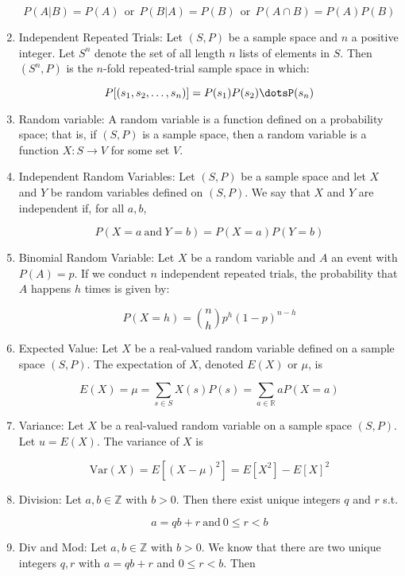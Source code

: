 \documentclass{article}
\begin{document}
\begin{enumerate}
		\[P(A|B)=P(A)\:\: \text{or} \:\: P(B|A)=P(B) \:\: \text{or} \:\: P(A\cap B)=P(A)P(B)\]
		
		\item Independent Repeated Trials: Let $(S,P)$ be a sample space and $n$ a positive integer.
		Let $S^n$ denote the set of all length $n$ lists of elements in $S$.
		Then $(S^n,P)$ is the $n$-fold repeated-trial sample space in which:
		
		\[P[(s_1,s_2,\dots,s_n)]=P(s_1)P(s_2)\dotsP(s_n)\]
		
		\item Random variable: A random variable is a function defined on a probability space;
		that is, if $(S,P)$ is a sample space, then a random variable is a function $X:S\to V$ for some set $V$.
		
		\item Independent Random Variables: Let $(S,P)$ be a sample space and let $X$ and $Y$ be random variables defined on $(S,P)$.
		We say that $X$ and $Y$ are independent if, for all $a,b$,
		
		\[P(X=a\: \text{and} \: Y=b)=P(X=a)P(Y=b)\]
		
		\item Binomial Random Variable: Let $X$ be a random variable and $A$ an event with $P(A)=p$.
		If we conduct $n$ independent repeated trials, the probability that $A$ happens $h$ times is given by:
		
		\[P(X=h)= {n \choose h} p^h(1-p)^{n-h}\]
		
		\item Expected Value: Let $X$ be a real-valued random variable defined on a sample space $(S,P)$.
		The expectation of $X$, denoted $E(X)$ or $\mu$, is
		
		\[E(X)=\mu=\sum_{s\in S}X(s)P(s)=\sum_{a\in\mathbb{R}}aP(X=a)\]
		
		\item Variance: Let $X$ be a real-valued random variable on a sample space $(S,P)$.
		Let $u=E(X)$.
		The variance of $X$ is
		
		\[\text{Var}(X)=E[(X-\mu)^2]=E[X^2]-E[X]^2\]
		
		\item Division: Let $a,b\in\mathbb{Z}$ with $b>0$.
		Then there exist unique integers $q$ and $r$ s.t.
		
		\[a=qb+r \: \text{and} \: 0\leq r<b\]
		
		\item Div and Mod: Let $a,b\in\mathbb{Z}$ with $b>0$.
		We know that there are two unique integers $q,r$ with $a=qb+r$ and $0\leq r<b$.
		Then
		

\end{enumerate}
\end{document}
